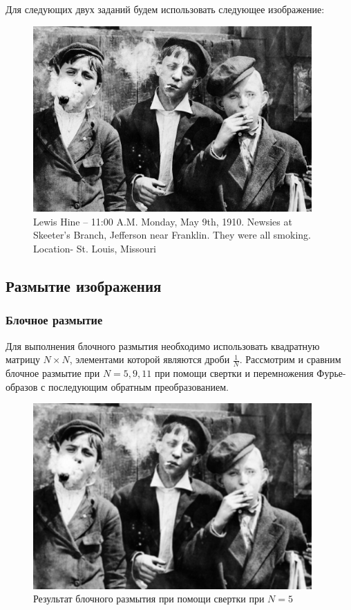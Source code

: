  Для следующих двух заданий будем использовать следующее изображение:

 \begin{figure}[ht!]
    \centering
    \includegraphics[width=0.95\textwidth]{images/source_images/task_2_3/smoking-boys.jpg}
    \caption{Lewis Hine -- 11:00 A.M. Monday, May 9th, 1910. Newsies at Skeeter's Branch, Jefferson near Franklin. They were all smoking. Location- St. Louis, Missouri}
    \label{fig:smoking_boys}
\end{figure}

 \subsection{Размытие изображения}
 \subsubsection{Блочное размытие}

 Для выполнения блочного размытия необходимо использовать квадратную матрицу $N \times N$, элементами которой являются дроби $\frac{1}{N}$. Рассмотрим и сравним блочное размытие при $N=5, 9, 11$ при помощи свертки и перемножения Фурье-образов с последующим обратным преобразованием.

 \begin{figure}[ht!]
    \centering
    \includegraphics[width=0.95\textwidth]{images/result/task_2/Averaging_5.png}
    \caption{Результат блочного размытия при помощи свертки при $N=5$}
    \label{fig:av_c_5}
\end{figure}


